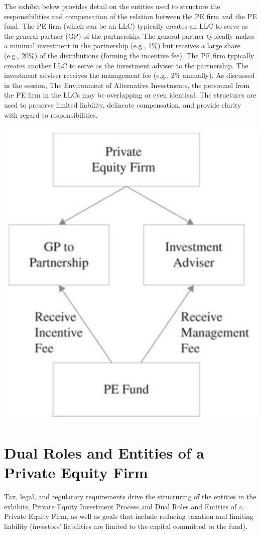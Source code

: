 \documentclass[11pt]{article}
\begin{document}
The exhibit below provides detail on the entities used to structure the responsibilities and compensation of the relation between the PE firm and the PE fund. The PE firm (which can be an LLC) typically creates an LLC to serve as the general partner (GP) of the partnership. The general partner typically makes a minimal investment in the partnership (e.g., 1\%) but receives a large share (e.g., 20\%) of the distributions (forming the incentive fee). The PE firm typically creates another LLC to serve as the investment adviser to the partnership. The investment adviser receives the management fee (e.g., $2 \%$ annually). As discussed in the session, The Environment of Alternative Investments, the personnel from the PE firm in the LLCs may be overlapping or even identical. The structures are used to preserve limited liability, delineate compensation, and provide clarity with regard to responsibilities.

\begin{center}
\includegraphics[max width=\textwidth]{2024_04_10_0f4705c4c528462354f4g-3}
\end{center}

\section*{Dual Roles and Entities of a Private Equity Firm}
Tax, legal, and regulatory requirements drive the structuring of the entities in the exhibits, Private Equity Investment Process and Dual Roles and Entities of a Private Equity Firm, as well as goals that include reducing taxation and limiting liability (investors' liabilities are limited to the capital committed to the fund).
\end{document}
